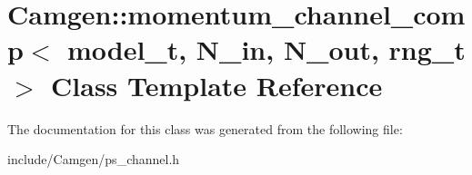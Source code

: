 \hypertarget{a00373}{\section{Camgen\-:\-:momentum\-\_\-channel\-\_\-comp$<$ model\-\_\-t, N\-\_\-in, N\-\_\-out, rng\-\_\-t $>$ Class Template Reference}
\label{a00373}
}


The documentation for this class was generated from the following file\-:\begin{DoxyCompactItemize}
\item 
include/\-Camgen/ps\-\_\-channel.\-h\end{DoxyCompactItemize}
